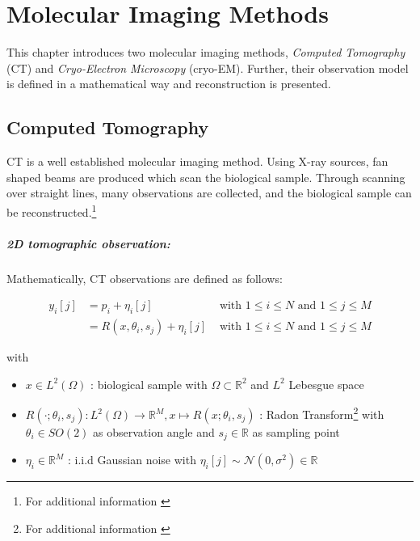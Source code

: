 \chapter{Molecular Imaging Methods}
\label{sec:imaging}

This chapter introduces two molecular imaging methods, \textit{Computed Tomography} (CT) and 
\textit{Cryo-Electron Microscopy} (cryo-EM). 
Further, their observation model is defined in a mathematical way and reconstruction is presented.




\section{Computed Tomography}
CT is a well established molecular imaging method.
Using X-ray sources, fan shaped beams are produced which scan the biological sample.
Through scanning over straight lines, many observations are collected, 
and the biological sample can be reconstructed.\footnote{For additional information \cite{computedTomography}}

\paragraph{2D tomographic observation:}

Mathematically, CT observations are defined as follows:

\begin{equation}
    \label{eq:2Dreconstruction}
    \begin{aligned}
        y_i[j] &= p_i + \eta_i[j] & \text{ with } 1 \leq i \leq N \text{ and } 1 \leq j \leq M \\
               &= R(x, \theta_i, s_j) + \eta_i[j] & \text{ with } 1 \leq i \leq N \text{ and } 1 \leq j \leq M
    \end{aligned}
\end{equation}

with
\begin{itemize}
    \item $x \in L^2(\Omega)$ : biological sample with $\Omega \subset \mathbb{R}^2 $ and $L^2$ Lebesgue space
    \item $R(\cdot; \theta_i, s_j): L^2(\Omega) \to \mathbb{R}^M , x \mapsto R(x; \theta_i, s_j)$ : Radon Transform\footnote{For additional information \cite{radonTransform}} 
        with $\theta_i \in SO(2)$ as observation angle and $s_j \in \mathbb{R}$ as sampling point
    \item $\eta_i \in \mathbb{R}^M$ : i.i.d Gaussian noise with $\eta_i[j] \sim \mathcal{N}(0,\sigma^2) \in \mathbb{R}$
\end{itemize}


